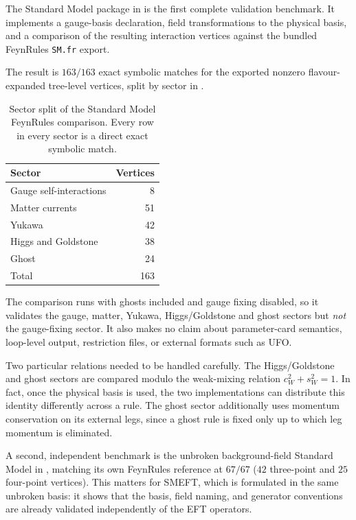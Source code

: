 The Standard Model package in  is the first complete validation benchmark. It implements a gauge-basis declaration, field
transformations to the physical basis, and a comparison of the resulting
interaction vertices against the bundled FeynRules \texttt{SM.fr} export.

The result is $163/163$ exact symbolic matches for the exported nonzero
flavour-expanded tree-level vertices, split by sector in
.

\begin{table}[htbp]
\centering
\begin{tabular}{lr}
\toprule
Sector & Vertices \\
\midrule
Gauge self-interactions & 8 \\
Matter currents & 51 \\
Yukawa & 42 \\
Higgs and Goldstone & 38 \\
Ghost & 24 \\
\midrule
Total & 163 \\
\bottomrule
\end{tabular}
\caption{Sector split of the Standard Model FeynRules comparison. Every row
in every sector is a direct exact symbolic match.}
\label{tab:validation-sm-sectors}
\end{table}

The comparison runs with ghosts included and gauge fixing disabled, so it validates the gauge, matter, Yukawa, Higgs/Goldstone and ghost sectors but \emph{not} the gauge-fixing sector. It also makes no claim about parameter-card semantics, loop-level output, restriction files, or external formats such as UFO.

Two particular relations needed to be handled carefully. The Higgs/Goldstone and ghost sectors are compared modulo the weak-mixing relation $c_W^2 + s_W^2 = 1$. In fact, once the physical basis is used, the two implementations can distribute this identity differently across a rule. The ghost sector additionally uses momentum conservation on its external legs, since a ghost rule is fixed only up to which leg momentum is eliminated.

A second, independent benchmark is the unbroken background-field Standard Model in , matching its own FeynRules reference at $67/67$ ($42$ three-point and $25$ four-point vertices). This matters for SMEFT, which is formulated in the same unbroken basis: it shows that the basis, field naming, and generator conventions are already validated independently of the EFT operators.

